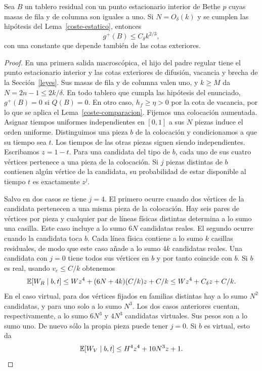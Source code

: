 \begin{proposicion}\label{coste-macro}
Sea $B$ un tablero residual con un punto estacionario interior de Bethe $p$ cuyas masas de fila y de
columna son iguales a uno. Si $N=O_\delta(k)$ y se cumplen las hipótesis del Lema~\ref{coste-estatico},
entonces
\[
 g^+(B)\le C_\delta k^{2/3},
\]
con una constante que depende también de las cotas exteriores.
\end{proposicion}
\begin{proof}
En una primera salida macroscópica, el hijo del padre regular tiene el punto estacionario interior y
las cotas exteriores de difusión, vacancia y brecha de la Sección~\ref{leyes}. Sus masas de fila y de
columna valen uno, y $k\ge M$ da $N=2n-1\le2k/\delta$. En todo tablero que cumpla las hipótesis del
enunciado, $g^+(B)=0$ si $Q(B)=0$. En otro caso, $h_f\ge\eta>0$ por la cota de vacancia, por lo que
se aplica el Lema~\ref{coste-comparacion}. Fijemos una colocación aumentada. Asignar tiempos
uniformes independientes en $[0,1]$ a sus $N$ piezas induce el orden uniforme. Distinguimos una pieza
$b$ de la colocación y condicionamos a que su tiempo sea $t$. Los tiempos de las otras piezas siguen
siendo independientes. Escribamos $z=1-t$. Para una candidata del tipo de $b$, cada uno de sus cuatro
vértices pertenece a una pieza de la colocación. Si $j$ piezas distintas de $b$ contienen algún
vértice de la candidata, su probabilidad de estar disponible al tiempo $t$ es exactamente $z^j$.

Salvo en dos casos se tiene $j=4$. El primero ocurre cuando dos vértices de la candidata pertenecen a
una misma pieza de la colocación. Hay seis pares de vértices por pieza y cualquier par de líneas
físicas distintas determina a lo sumo una casilla. Este caso incluye a lo sumo $6N$ candidatas reales.
El segundo ocurre cuando la candidata toca $b$. Cada línea física contiene a lo sumo $k$ casillas
residuales, de modo que este caso añade a lo sumo $4k$ candidatas reales. Una candidata con $j=0$
tiene todos sus vértices en $b$ y por tanto coincide con $b$. Si $b$ es real, usando $v_e\le C/k$
obtenemos
\[
 \mathbb{E}[W_R\mid b,t]\le W z^4+(6N+4k)(C/k)z+C/k
                   \le W z^4+C_\delta z+C/k .
\]
En el caso virtual, para dos vértices fijados en familias distintas hay a lo sumo $N^2$ candidatas, y
para uno solo a lo sumo $N^3$. Los dos casos anteriores cuentan, respectivamente, a lo sumo $6N^3$ y
$4N^3$ candidatas virtuales. Sus pesos son a lo sumo uno. De nuevo sólo la propia pieza puede tener
$j=0$. Si $b$ es virtual, esto da
\[
 \mathbb{E}[W_V\mid b,t]\le H^4 z^4+10N^3z+1.
\]


\end{proof}
